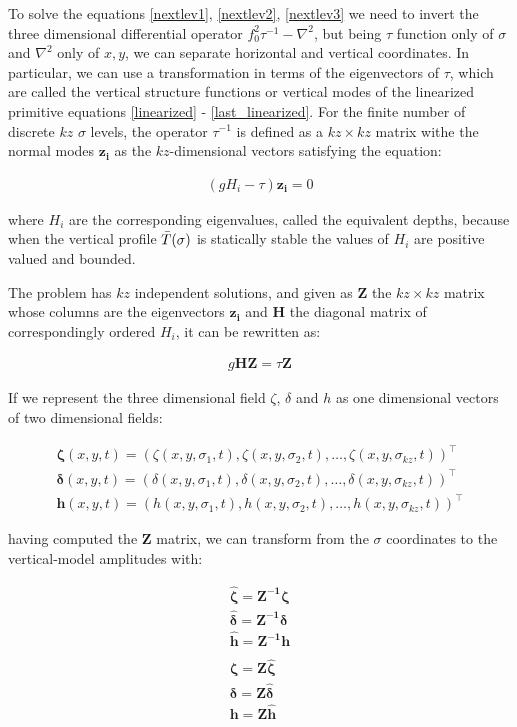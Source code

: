To solve the equations \ref{nextlev1}, \ref{nextlev2}, \ref{nextlev3} we need
to invert the three dimensional differential operator $f_0^2\tau^{-1}-\nabla^2$,
but being $\tau$ function only of $\sigma$ and $\nabla^2$ only of $x,y$, we can
separate horizontal and vertical coordinates.
In particular, we can use a transformation in terms of the eigenvectors of
$\tau$, which are called the vertical structure functions or vertical modes
of the linearized primitive equations \ref{linearized} - \ref{last_linearized}.
For the finite number of discrete $kz$ $\sigma$ levels, the operator $\tau^{-1}$
is defined as a $kz\times kz$ matrix withe the normal modes $\bm{z_i}$ as the
$kz$-dimensional vectors satisfying the equation:

\begin{gather}
  \left( g H_i - \tau \right) \bm{z_i} = 0
\end{gather}

where $H_i$ are the corresponding eigenvalues, called the equivalent depths,
because when the vertical profile $\bar{T}(\sigma)$ is statically stable the
values of $H_i$ are positive valued and bounded.

The problem has $kz$ independent solutions, and given as $\bm{Z}$ the
$kz\times kz$ matrix whose columns are the eigenvectors $\bm{z_i}$ and
$\bm{H}$ the diagonal matrix of correspondingly ordered $H_i$, it can
be rewritten as:

\begin{gather}
  g\bm{H}\bm{Z} = \tau \bm{Z}
\end{gather}

If we represent the three dimensional field $\zeta$, $\delta$ and $h$ as one
dimensional vectors of two dimensional fields:

\begin{gather}
  \bm{\zeta}(x,y,t) = (\zeta(x,y,\sigma_1,t),\zeta(x,y,\sigma_2,t),
         \dots,\zeta(x,y,\sigma_{kz},t))^\top \\
  \bm{\delta}(x,y,t) = (\delta(x,y,\sigma_1,t),\delta(x,y,\sigma_2,t),
         \dots,\delta(x,y,\sigma_{kz},t))^\top \\
  \bm{h}(x,y,t) = (h(x,y,\sigma_1,t),h(x,y,\sigma_2,t),
         \dots,h(x,y,\sigma_{kz},t))^\top
\end{gather}

having computed the $\bm{Z}$ matrix, we can transform from the $\sigma$
coordinates to the vertical-model amplitudes with:

\begin{gather}
  \label{hatz1}
  \hat{\bm{\zeta}} = \bm{Z^{-1}} \bm{\zeta} \\
  \label{hatz2}
  \hat{\bm{\delta}} = \bm{Z^{-1}} \bm{\delta} \\
  \label{hatz3}
  \hat{\bm{h}} = \bm{Z^{-1}} \bm{h} \\
  \nonumber \\
  \bm{\zeta} = \bm{Z} \hat{\bm{\zeta}} \\
  \bm{\delta} = \bm{Z} \hat{\bm{\delta}} \\
  \bm{h} = \bm{Z} \hat{\bm{h}}
\end{gather}

